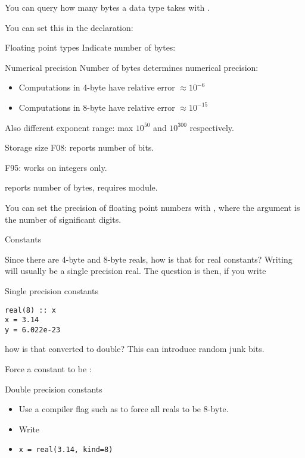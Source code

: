 You can query how many bytes a data type takes with
.

You can set this in the declaration:
%

\begin{slide}{Floating point types}
  \label{sl:ffloat}
  Indicate number of bytes:
\end{slide}

\begin{block}{Numerical precision}
  \label{sl:fprecision48}
  Number of bytes determines numerical precision:
  \begin{itemize}
  \item Computations in 4-byte have relative error $\approx 10^{-6}$
  \item Computations in 8-byte have relative error $\approx 10^{-15}$
  \end{itemize}
  Also different exponent range: max $10^{50}$ and $10^{300}$ respectively.
\end{block}

\begin{block}{Storage size}
  F08:  reports number of bits.

  F95:  works on integers only.

   reports number of bytes, requires
   module.
\end{block}

You can set the precision of floating point numbers with
, where the argument is the number
of significant digits.

 {Constants}

Since there are 4-byte and 8-byte reals, how is that for real
constants? Writing  will usually be a single precision
real. The question is then, if you write
\begin{block}{Single precision constants}
  \label{sl:fsingle}
\begin{verbatim}
real(8) :: x
x = 3.14
y = 6.022e-23
\end{verbatim}
\end{block}

how is that converted to double? This can introduce random junk bits.

Force a constant to be :
\begin{block}{Double precision constants}
  \label{sl:fdouble}
  \begin{itemize}
  \item Use a compiler flag such as  to force all reals to be 8-byte.
  \item Write 
  \item \verb+x = real(3.14, kind=8)+
  \end{itemize}
\end{block}

